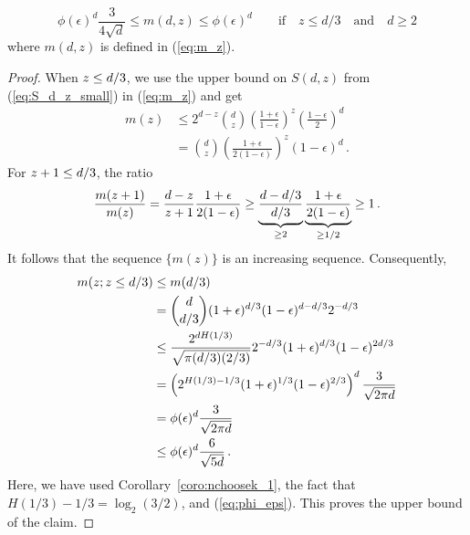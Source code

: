 \begin{claim}\label{claim:t1star-exact}
\[
\phi(\epsilon)^d \frac{3}{4\sqrt{d}}
\leq 
m(d, z) 
\leq \phi(\epsilon)^d
\qquad \text{if}\quad z \leq d/3 \quad \text{and}\quad d\geq 2
\]
where $m(d, z)$ is defined in (\ref{eq:m_z}). 
\end{claim}

\begin{proof}
When $z \leq d/3$, we use the upper bound on $S(d,z)$ from (\ref{eq:S_d_z_small}) in (\ref{eq:m_z}) and get
\begin{align*}
m(z)
&\leq 2^{d-z} {d \choose z} \left(\frac{1+\epsilon}{1-\epsilon}\right)^{z} \left(\frac{1-\epsilon}{2}\right)^{d} \\
&= {d \choose z} \left(\frac{1+\epsilon}{2(1-\epsilon)}\right)^{z} (1-\epsilon)^d\,.
\end{align*}
For $z+1 \leq d/3$, the ratio 
\[
\frac{m(z+1)}{m(z)} 
= \frac{d-z}{z+1} \frac{1+\epsilon}{2(1-\epsilon)}
\geq \underbrace{\frac{d-d/3}{d/3}}_{\geq 2} \underbrace{\frac{1+\epsilon}{2(1-\epsilon)}}_{\geq 1/2}
\geq 1\, .
\]
It follows that the sequence $\{m(z)\}$ is an increasing sequence. Consequently,
\begin{align}
m(z; z \leq d/3)
&\leq m(d/3) \nonumber \\
&= {d \choose d/3} (1+\epsilon)^{d/3} (1-\epsilon)^{d- d/3}2^{-d/3} \nonumber \\
&\leq \frac{2^{d H(1/3)}}{\sqrt{\pi (d/3) (2/3)}} 2^{-d/3} (1+\epsilon)^{d/3} (1-\epsilon)^{2d/3} \nonumber \\
&= \left(2^{H(1/3)-1/3} (1+\epsilon)^{1/3} (1-\epsilon)^{2/3} \right)^d \frac{3}{\sqrt{2 \pi d}} \nonumber \\
&= \phi(\epsilon)^d \frac{3}{\sqrt{2 \pi d}} \nonumber \\
&\leq \phi(\epsilon)^d \frac{6}{\sqrt{5 d}} \, . \label{eq:t1star-q1}
\end{align}
Here, we have used Corollary~\ref{coro:nchoosek_1}, the fact that $H(1/3) - 1/3 = \log_2(3/2)$, and (\ref{eq:phi_eps}). This proves the upper bound of the claim. 


\end{proof}
